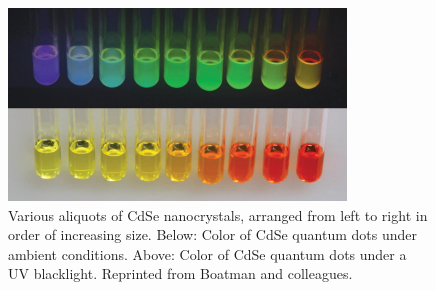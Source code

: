 \documentclass[journal = jceda8, manuscript = article]{achemso}
\begin{document}
\begin{figure}[H]
	\includegraphics[width=0.8\textwidth]{./figures/colors.png}
	\caption{Various aliquots of CdSe nanocrystals, arranged from left to
	right in order of increasing size. Below: Color of CdSe quantum dots under
ambient conditions. Above: Color of CdSe quantum dots under a UV blacklight.
Reprinted from Boatman and colleagues. \cite{jce-2}}
\end{figure}
\end{document}
